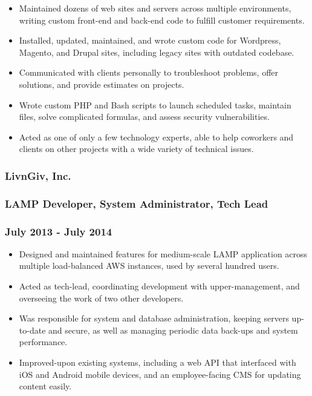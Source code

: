 \begin{itemize}
\tightlist
\item
  Maintained dozens of web sites and servers across multiple
  environments, writing custom front-end and back-end code to fulfill
  customer requirements.
\item
  Installed, updated, maintained, and wrote custom code for Wordpress,
  Magento, and Drupal sites, including legacy sites with outdated
  codebase.
\item
  Communicated with clients personally to troubleshoot problems, offer
  solutions, and provide estimates on projects.
\item
  Wrote custom PHP and Bash scripts to launch scheduled tasks, maintain
  files, solve complicated formulas, and assess security
  vulnerabilities.
\item
  Acted as one of only a few technology experts, able to help coworkers
  and clients on other projects with a wide variety of technical issues.
\end{itemize}

\hypertarget{livngiv-inc.}{%
\subsubsection{LivnGiv, Inc.}\label{livngiv-inc.}}

\hypertarget{lamp-developer-system-administrator-tech-lead}{%
\subsubsection{LAMP Developer, System Administrator, Tech
Lead}\label{lamp-developer-system-administrator-tech-lead}}

\hypertarget{july-2013---july-2014}{%
\subsubsection{July 2013 - July 2014}\label{july-2013---july-2014}}

\begin{itemize}
\tightlist
\item
  Designed and maintained features for medium-scale LAMP application
  across multiple load-balanced AWS instances, used by several hundred
  users.
\item
  Acted as tech-lead, coordinating development with upper-management,
  and overseeing the work of two other developers.
\item
  Was responsible for system and database administration, keeping
  servers up-to-date and secure, as well as managing periodic data
  back-ups and system performance.
\item
  Improved-upon existing systems, including a web API that interfaced
  with iOS and Android mobile devices, and an employee-facing CMS for
  updating content easily.
\end{itemize}

